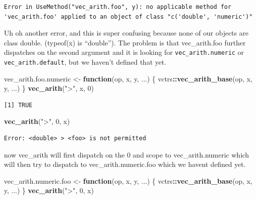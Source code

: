 \documentclass[]{book}
\newenvironment{Shaded}{\begin{snugshade}}{\end{snugshade}}
\newcommand{\ControlFlowTok}[1]{\textcolor[rgb]{0.13,0.29,0.53}{\textbf{#1}}}
\newcommand{\DecValTok}[1]{\textcolor[rgb]{0.00,0.00,0.81}{#1}}
\newcommand{\KeywordTok}[1]{\textcolor[rgb]{0.13,0.29,0.53}{\textbf{#1}}}
\newcommand{\NormalTok}[1]{#1}
\newcommand{\OperatorTok}[1]{\textcolor[rgb]{0.81,0.36,0.00}{\textbf{#1}}}
\newcommand{\StringTok}[1]{\textcolor[rgb]{0.31,0.60,0.02}{#1}}
\begin{document}
\begin{verbatim}
Error in UseMethod("vec_arith.foo", y): no applicable method for 'vec_arith.foo' applied to an object of class "c('double', 'numeric')"
\end{verbatim}

Uh oh another error, and this is super confusing because none of our objects are class double. (typeof(x) is ``double''). The problem is that vec\_arith.foo further dispatches on the second argument and it is looking for \texttt{vec\_arith.numeric} or \texttt{vec\_arith.default}, but we haven't defined that yet.

\begin{Shaded}
\begin{Highlighting}[]
\NormalTok{vec_arith.foo.numeric <-}\StringTok{ }\ControlFlowTok{function}\NormalTok{(op, x, y, ...) \{}
\NormalTok{  vctrs}\OperatorTok{::}\KeywordTok{vec_arith_base}\NormalTok{(op, x, y, ...)}
\NormalTok{\}}
\KeywordTok{vec_arith}\NormalTok{(}\StringTok{">"}\NormalTok{, x, }\DecValTok{0}\NormalTok{)}
\end{Highlighting}
\end{Shaded}

\begin{verbatim}
[1] TRUE
\end{verbatim}

\begin{Shaded}
\begin{Highlighting}[]
\KeywordTok{vec_arith}\NormalTok{(}\StringTok{">"}\NormalTok{, }\DecValTok{0}\NormalTok{, x)}
\end{Highlighting}
\end{Shaded}

\begin{verbatim}
Error: <double> > <foo> is not permitted
\end{verbatim}

now vec\_arith will first dispatch on the 0 and scope to vec\_arith.numeric which will then try to dispatch to vec\_arith.numeric.foo which we havent defined yet.

\begin{Shaded}
\begin{Highlighting}[]
\NormalTok{vec_arith.numeric.foo <-}\StringTok{ }\ControlFlowTok{function}\NormalTok{(op, x, y, ...) \{}
\NormalTok{  vctrs}\OperatorTok{::}\KeywordTok{vec_arith_base}\NormalTok{(op, x, y, ...) }
\NormalTok{\}}
\KeywordTok{vec_arith}\NormalTok{(}\StringTok{">"}\NormalTok{, }\DecValTok{0}\NormalTok{, x)}
\end{Highlighting}
\end{Shaded}
\end{document}
